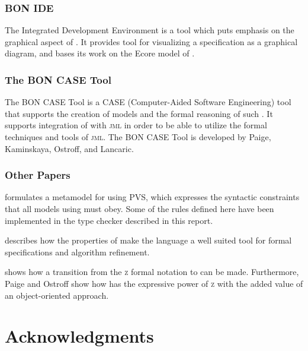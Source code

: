 \subsubsection{BON IDE}
The \bon{} Integrated Development Environment is a tool which puts emphasis on the graphical aspect of \bon{} \cite{bonide}. It provides tool for visualizing a \bon{} specification as a graphical diagram, and bases its work on the Ecore model of \bon{}.

\subsubsection{The BON CASE Tool}
The BON CASE Tool is a CASE (Computer-Aided Software Engineering) tool that supports the creation of \bon{} models and the formal reasoning of such \cite{boncase}. It supports integration of \bon{} with \textsc{jml} in order to be able to utilize the formal techniques and tools of \textsc{jml}. The BON CASE Tool is developed by Paige, Kaminskaya, Ostroff, and Lancaric.

\subsubsection{Other Papers}
\cite{ostroff2001} formulates a metamodel for \bon{} using PVS, which expresses the syntactic constraints that all models using \bon{} must obey. Some of the rules defined here have been implemented in the type checker described in this report.

\cite{ostroff1999} describes how the properties of \bon{} make the language a well suited tool for formal specifications and algorithm refinement.

\cite{ostroff1998} shows how a transition from the \textsc{z} formal notation to \bon{} can be made. Furthermore, Paige and Ostroff show how \bon{} has the expressive power of \textsc{z} with the added value of an object-oriented approach.

\section{Acknowledgments}

